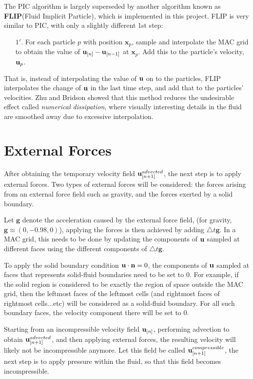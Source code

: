 The PIC algorithm is largely superseded by another algorithm known as \textbf{FLIP}(Fluid Implicit Particle), which is implemented in this project. FLIP is very similar to PIC, with only a slightly different 1st step:
\begin{enumerate}
    \item [$1'.$]
    For each particle $p$ with position $\textbf{x}_p$, sample and interpolate the MAC grid to obtain the value of $\textbf{u}_{[n]} - \textbf{u}_{[n-1]}$ at $\textbf{x}_p$. Add this to the particle's velocity,  $\textbf{u}_p$.
\end{enumerate}
That is, instead of interpolating the value of $\textbf{u}$ on to the particles, FLIP interpolates the change of $\textbf{u}$ in the last time step, and add that to the particles' velocities. Zhu and Bridson \cite{zhu2005animating} showed that this method reduces the undesirable effect called \textit{numerical dissipation}, where visually interesting details in the fluid are smoothed away due to excessive interpolation.



\section{External Forces}

After obtaining the temporary velocity field $\textbf{u}_{[n+1]}^{advected}$, the next step is to apply external forces. Two types of external forces will be considered: the forces arising from an external force field such as gravity, and the forces exerted by a solid boundary.

Let $\textbf{g}$ denote the acceleration caused by the external force field, (for gravity, $\textbf{g}\approx(0,-0.98,0)$), applying the forces is then achieved by adding $\triangle t \textbf{g}$. In a MAC grid, this needs to be done by updating the components of $\textbf{u}$ sampled at different faces using the different components of $\triangle t \textbf{g}$. 


To apply the solid boundary condition $\textbf{u} \cdot \textbf{n} = 0$, the components of $\textbf{u}$ sampled at faces that represents solid-fluid boundaries need to be set to 0. For example, if the solid region is considered to be exactly the region of space outside the MAC grid, then the leftmost faces of the leftmost cells (and rightmost faces of rightmost cells...etc) will be considered as a solid-fluid boundary. For all such boundary faces, the velocity component there will be set to 0. 

Starting from an incompressible velocity field $\textbf{u}_{[n]}$, performing advection to obtain $\textbf{u}_{[n+1]}^{advected}$, and then applying external forces, the resulting velocity will likely not be incompressible anymore. Let this field be called $\textbf{u}_{[n+1]}^{compressible}$, the next step is to apply pressure within the fluid, so that this field becomes incompressible.


